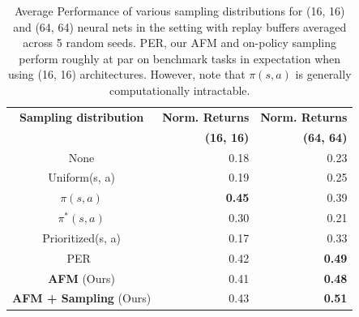 \begin{table}
    \centering
    \small{
    \begin{tabular}{|c|r|r|}
    \hline
    \textbf{Sampling distribution} & \textbf{Norm. Returns} & \textbf{Norm. Returns} \\
     & \textbf{(16, 16)} & \textbf{(64, 64)} \\
     \hline\hline
    None &  0.18 & 0.23 \\
    \hline
    Uniform(s, a) &  0.19 & 0.25 \\
    \hline
    $\pi(s, a)$ &  \textbf{0.45} & 0.39 \\
    \hline
    $\pi^*(s, a)$ & 0.30 & 0.21 \\
    \hline
    Prioritized(s, a) & 0.17 & 0.33 \\
    \hline
    PER~\cite{Schaul2015} & 0.42 & \textbf{0.49}\\
    \hline
    \textbf{AFM} (Ours) & 0.41 & \textbf{0.48} \\
    \hline
    \textbf{AFM + Sampling} (Ours) & 0.43 & \textbf{0.51} \\
    \hline
     \end{tabular}}
    \caption{\label{table:final}Average Performance of various sampling distributions for (16, 16) and (64, 64) neural nets in the setting with replay buffers averaged across 5 random seeds. PER, our AFM and on-policy sampling perform roughly at par on benchmark tasks in expectation when using (16, 16) architectures. However, note that  $\pi(s,a)$ is generally computationally intractable.}
    \vspace{-0.2in}
    \vspace{-10pt}
\end{table}

\fi